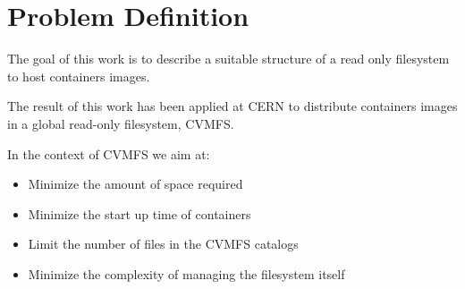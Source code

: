 \chapter{Problem Definition}\label{ch:ProblemDefinition}

The goal of this work is to describe a suitable structure of a read only filesystem to host containers images.

The result of this work has been applied at CERN to distribute containers images in a global read-only filesystem, CVMFS.

In the context of CVMFS we aim at:
\begin{itemize}
\item Minimize the amount of space required
\item Minimize the start up time of containers
\item Limit the number of files in the CVMFS catalogs 
\item Minimize the complexity of managing the filesystem itself
\end{itemize}

